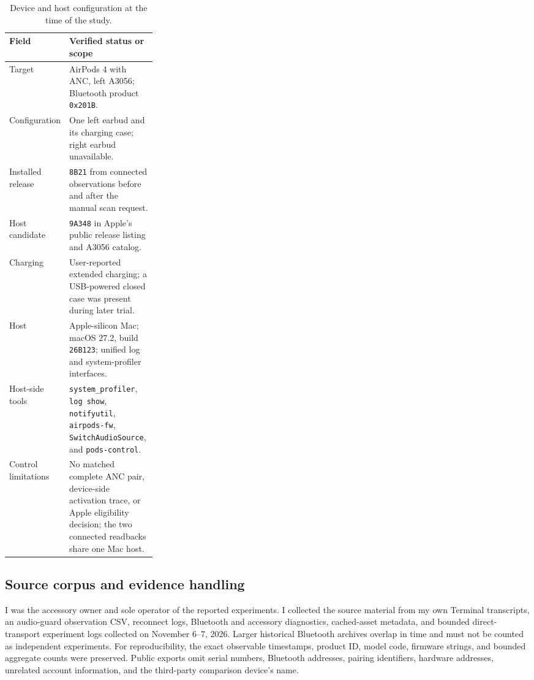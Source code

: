 \documentclass[11pt,letterpaper]{article}
\begin{document}
\begin{table}[htbp]\centering\small
\caption{Device and host configuration at the time of the study.}\label{tab:env}
\begin{tabularx}{\linewidth}{@{}p{0.28\linewidth}X@{}}\toprule
Field & Verified status or scope \\ \midrule
Target & AirPods 4 with ANC, left A3056; Bluetooth product \texttt{0x201B}. \\
Configuration & One left earbud and its charging case; right earbud unavailable. \\
Installed release & \texttt{8B21} from connected observations before and after the manual scan request. \\
Host candidate & \texttt{9A348} in Apple's public release listing and A3056 catalog. \\
Charging & User-reported extended charging; a USB-powered closed case was present during later trial. \\
Host & Apple-silicon Mac; macOS 27.2, build \texttt{26B123}; unified log and system-profiler interfaces. \\
Host-side tools & \texttt{system\_profiler}, \texttt{log show}, \texttt{notifyutil}, \texttt{airpods-fw}, \texttt{SwitchAudioSource}, and \texttt{pods-control}. \\
Control limitations & No matched complete ANC pair, device-side activation trace, or Apple eligibility decision; the two connected readbacks share one Mac host. \\
\bottomrule\end{tabularx}
\end{table}

\subsection{Source corpus and evidence handling}
I was the accessory owner and sole operator of the reported experiments. I collected the source material from my own Terminal transcripts, an audio-guard observation CSV, reconnect logs, Bluetooth and accessory diagnostics, cached-asset metadata, and bounded direct-transport experiment logs collected on November 6--7, 2026. Larger historical Bluetooth archives overlap in time and must not be counted as independent experiments. For reproducibility, the exact observable timestamps, product ID, model code, firmware strings, and bounded aggregate counts were preserved. Public exports omit serial numbers, Bluetooth addresses, pairing identifiers, hardware addresses, unrelated account information, and the third-party comparison device's name.
\end{document}

